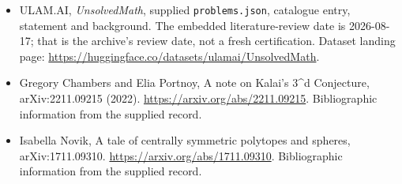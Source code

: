 \documentclass[11pt,a4paper]{article}
\begin{document}
{\small

\begin{itemize}

\item[\hypertarget{source:statement:1}{S1}] ULAM.AI, \emph{UnsolvedMath}, supplied \texttt{problems.json}, catalogue entry, statement and background. The embedded literature-review date is 2026-08-17; that is the archive’s review date, not a fresh certification. Dataset landing page: \url{https://huggingface.co/datasets/ulamai/UnsolvedMath}.

\item[\hypertarget{source:statement:2}{S2}] Gregory Chambers and Elia Portnoy, A note on Kalai's 3\textasciicircum{}d Conjecture, arXiv:2211.09215 (2022). \url{https://arxiv.org/abs/2211.09215}. Bibliographic information from the supplied record.

\item[\hypertarget{source:statement:3}{S3}] Isabella Novik, A tale of centrally symmetric polytopes and spheres, arXiv:1711.09310. \url{https://arxiv.org/abs/1711.09310}. Bibliographic information from the supplied record.

\end{itemize}

}

\label{end:statement}
\end{document}
